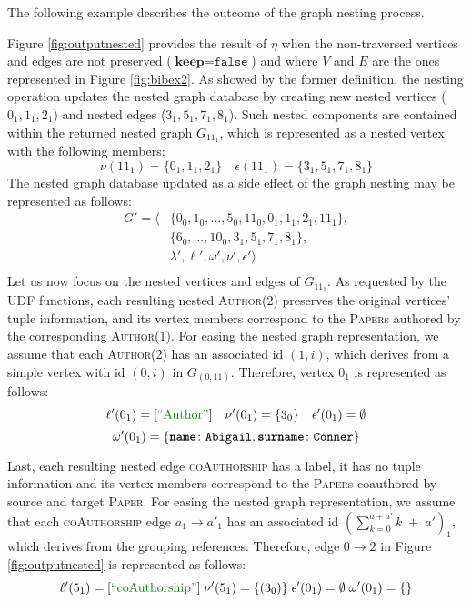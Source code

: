 The following example describes the outcome of the graph nesting process.

\begin{example}[label=exNest]
	Figure \ref{fig:outputnested} provides the result of $\eta$ when the non-traversed vertices and edges are not preserved ($\textbf{keep}=\texttt{false}$) and where $V$ and $E$ are the ones represented in Figure \ref{fig:bibex2}. As showed by the former definition, the nesting operation updates the nested graph database by creating new nested vertices ($0_1,1_1,2_1$) and nested edges ($3_1,5_1,7_1,8_1$). Such nested components are contained within the returned nested graph $G_{11_1}$, which is represented as a nested vertex with the following members:
	\[\nu(11_1)=\{0_1,1_1,2_1\}\quad \epsilon(11_1)=\{3_1,5_1,7_1,8_1\}\]
	The nested graph database updated as a side effect of the graph nesting may be represented as follows:
	\[\begin{split}
	G'=\big\langle &\{0_0,1_0,\dots,5_0,11_0,0_1,1_1,2_1,11_1\},\\
	& \{6_0,\dots,10_0,3_1,5_1,7_1,8_1\}, \\
	& \lambda',\ell',\omega',\nu',\epsilon'\big\rangle\\
	\end{split}\]
	Let us now focus on the nested vertices and edges of $G_{11_1}$. As requested by the UDF functions, each resulting nested \textsc{Author}(2) preserves the original  vertices' tuple information, and its vertex members correspond to the \textsc{Paper}s authored by the corresponding \textsc{Author}(1). For easing the nested graph representation, we assume that each \textsc{Author}(2) has an associated  id $(1,i)$, which derives from a simple vertex with id $(0,i)$ in $G_{(0,11)}$. Therefore, vertex $0_1$ is represented as follows:
	\[\ell'(0_1)=[\mstr{Author}]\quad\nu'(0_1)=\{3_0\}\quad \epsilon'(0_1)=\emptyset\] \[\omega'(0_1)=\{\texttt{\textbf{name}}\colon\texttt{Abigail},\texttt{\textbf{surname}}\colon\texttt{Conner}\}\]
	
	Last, each resulting nested edge \textsc{coAuthorship} has a  label, it has no tuple information and its vertex members correspond to the \textsc{Paper}s coauthored by source and target \textsc{Paper}.
	For easing the nested graph representation, we assume that each \textsc{coAuthorship} edge $a_1\to a'_1$ has an associated id $(\sum_{k=0}^{a+a'}k\;+\;a')_{1}$, which derives from the grouping references. Therefore, edge $0\to 2$ in Figure \ref{fig:outputnested} is represented as follows:
	\[\ell'(5_1)=[\mstr{coAuthorship}]\;\nu'(5_1)=\{(3_0)\}\;\epsilon'(0_1)=\emptyset\; \omega'(0_1)=\{\}\] 
\end{example}

